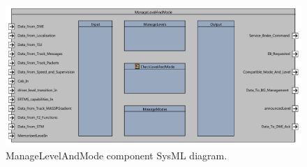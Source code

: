 \begin{figure}[H]
\center
\includegraphics[width=\textwidth]{images/F2_5_ManageLevelsAndModes.pdf}
\caption{ManageLevelAndMode component SysML diagram.}\label{f:mode_and_level}
\end{figure}

